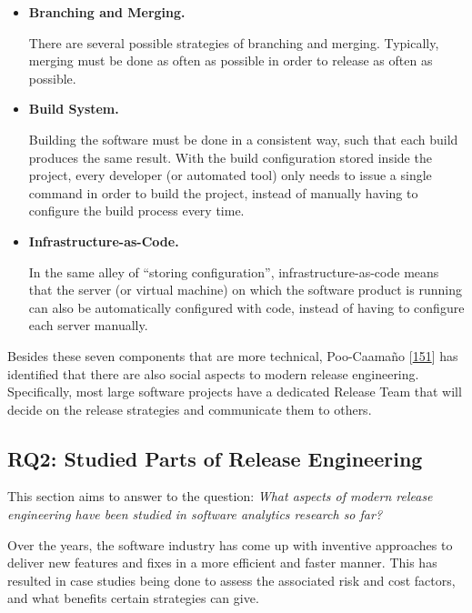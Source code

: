 \documentclass[]{book}
\begin{document}
\begin{itemize}
\item
  \textbf{Branching and Merging.}

  There are several possible strategies of branching and merging.
  Typically, merging must be done as often as possible in order to
  release as often as possible.
\item
  \textbf{Build System.}

  Building the software must be done in a consistent way, such that each
  build produces the same result. With the build configuration stored
  inside the project, every developer (or automated tool) only needs to
  issue a single command in order to build the project, instead of
  manually having to configure the build process every time.
\item
  \textbf{Infrastructure-as-Code.}

  In the same alley of ``storing configuration'', infrastructure-as-code
  means that the server (or virtual machine) on which the software
  product is running can also be automatically configured with code,
  instead of having to configure each server manually.
\end{itemize}

Besides these seven components that are more technical, Poo-Caamaño
{[}\protect\hyperlink{ref-poo-caamano2016a}{151}{]} has identified that
there are also social aspects to modern release engineering.
Specifically, most large software projects have a dedicated Release Team
that will decide on the release strategies and communicate them to
others.

\subsection{RQ2: Studied Parts of Release
Engineering}\label{rq2-studied-parts-of-release-engineering}

This section aims to answer to the question: \emph{What aspects of
modern release engineering have been studied in software analytics
research so far?}

Over the years, the software industry has come up with inventive
approaches to deliver new features and fixes in a more efficient and
faster manner. This has resulted in case studies being done to assess
the associated risk and cost factors, and what benefits certain
strategies can give.
\end{document}

